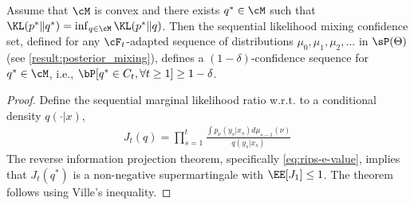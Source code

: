 \begin{theorem} Assume that $\cM$ is convex and there exists $q^* \in \cM$ such that $\KL(p^*\|q^*) = \inf_{q \in \cM} \KL(p^*\|q)$. Then the sequential likelihood mixing confidence set, defined for any $\cF_t$-adapted sequence of distributions $\mu_0, \mu_1, \mu_2, \dots$ in $\sP(\Theta)$ (see \cref{result:posterior_mixing}), defines a $(1-\delta)$-confidence sequence for $q^* \in \cM$, i.e., $\bP[q^* \in C_t, \forall t \geq 1] \geq 1-\delta$.
\end{theorem}
\begin{proof}
Define the sequential marginal likelihood ratio w.r.t. to a conditional density $q(\cdot|x)$,
\begin{align*}
J_t(q) = \prod_{s=1}^t\frac{\int p_\nu(y_s|x_s) d\mu_{s-1}(\nu)}{q(y_s|x_s)}
\end{align*}
The reverse information projection theorem, specifically \cref{eq:rips-e-value}, implies that $J_t(q^*)$ is a non-negative supermartingale with $\EE[J_1] \leq 1$. The theorem follows using Ville's inequality.
\end{proof}
